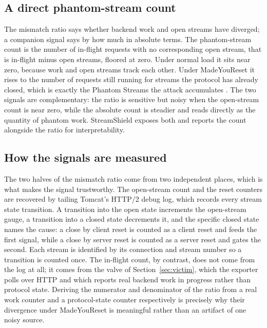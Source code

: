 \documentclass[a4paper,fleqn]{cas-dc}
\begin{document}
\subsection{A direct phantom-stream count}\label{sec:phantom-count}

The mismatch ratio says whether backend work and open streams have diverged; a companion signal says by how much in absolute terms. The phantom-stream count is the number of in-flight requests with no corresponding open stream, that is in-flight minus open streams, floored at zero. Under normal load it sits near zero, because work and open streams track each other. Under MadeYouReset it rises to the number of requests still running for streams the protocol has already closed, which is exactly the Phantom Streams the attack accumulates \cite{madeyouresetPaper}. The two signals are complementary: the ratio is sensitive but noisy when the open-stream count is near zero, while the absolute count is steadier and reads directly as the quantity of phantom work. StreamShield exposes both and reports the count alongside the ratio for interpretability.

\subsection{How the signals are measured}\label{sec:measurement}

The two halves of the mismatch ratio come from two independent places, which is what makes the signal trustworthy. The open-stream count and the reset counters are recovered by tailing Tomcat's HTTP/2 debug log, which records every stream state transition. A transition into the open state increments the open-stream gauge, a transition into a closed state decrements it, and the specific closed state names the cause: a close by client reset is counted as a client reset and feeds the first signal, while a close by server reset is counted as a server reset and gates the second. Each stream is identified by its connection and stream number so a transition is counted once. The in-flight count, by contrast, does not come from the log at all; it comes from the valve of Section~\ref{sec:victim}, which the exporter polls over HTTP and which reports real backend work in progress rather than protocol state. Deriving the numerator and denominator of the ratio from a real work counter and a protocol-state counter respectively is precisely why their divergence under MadeYouReset is meaningful rather than an artifact of one noisy source.
\end{document}

